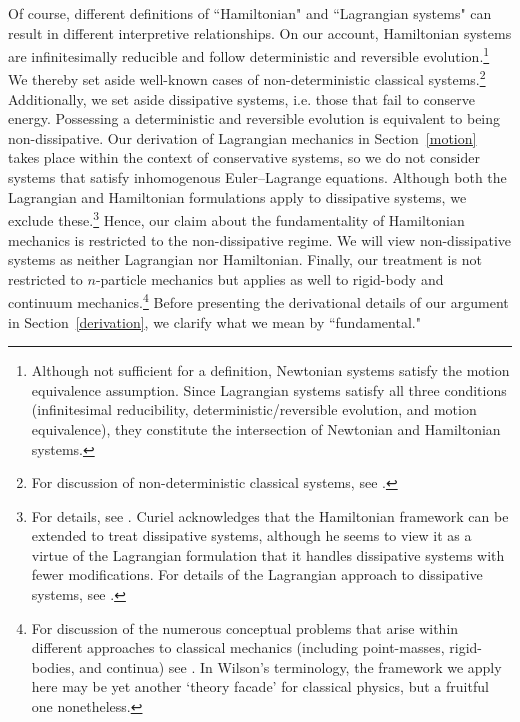 \documentclass[letterpaper]{article}
\begin{document}
Of course, different definitions of ``Hamiltonian" and ``Lagrangian systems" can result in different interpretive relationships. On our account, Hamiltonian systems are infinitesimally reducible and follow deterministic and reversible evolution.\footnote{Although not sufficient for a definition, Newtonian systems satisfy the motion equivalence assumption. Since Lagrangian systems satisfy all three conditions (infinitesimal reducibility, deterministic/reversible evolution, and motion equivalence), they constitute the intersection of Newtonian and Hamiltonian systems.} We thereby set aside well-known cases of non-deterministic classical systems.\footnote{For discussion of non-deterministic classical systems, see \textcites*[3-4]{Baez}{Earman}{Norton}.} Additionally, we set aside dissipative systems, i.e. those that fail to conserve energy. Possessing a deterministic and reversible evolution is equivalent to being non-dissipative. Our derivation of Lagrangian mechanics in Section~\ref{motion} takes place within the context of conservative systems, so we do not consider systems that satisfy inhomogenous Euler--Lagrange equations. Although both the Lagrangian and Hamiltonian formulations apply to dissipative systems, we exclude these.\footnote{For details, see \parencites[\S 10.4]{Cline}. Curiel \parencites*[311]{Curiel} acknowledges that the Hamiltonian framework can be extended to treat dissipative systems, although he seems to view it as a virtue of the Lagrangian formulation that it handles dissipative systems with fewer modifications. For details of the Lagrangian approach to dissipative systems, see \textcites[]{Smith}.} Hence, our claim about the fundamentality of Hamiltonian mechanics is restricted to the non-dissipative regime. We will view non-dissipative systems as neither Lagrangian nor Hamiltonian. Finally, our treatment is not restricted to $n$-particle mechanics but applies as well to rigid-body and continuum mechanics.\footnote{For discussion of the numerous conceptual problems that arise within different approaches to classical mechanics (including point-masses, rigid-bodies, and continua) see \textcites{Wilson}. In Wilson's terminology, the framework we apply here may be yet another `theory facade' for classical physics, but a fruitful one nonetheless.} Before presenting the derivational details of our argument in Section~\ref{derivation}, we clarify what we mean by ``fundamental."
\end{document}
